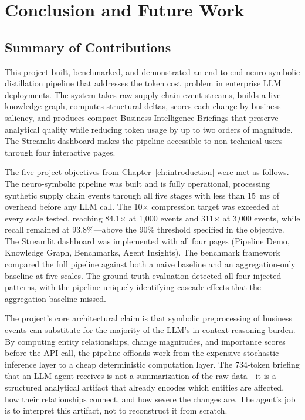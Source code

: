 \chapter{Conclusion and Future Work}
\label{ch:conclusion}

\section{Summary of Contributions}
\label{sec:contributions}

This project built, benchmarked, and demonstrated an end-to-end neuro-symbolic distillation
pipeline that addresses the token cost problem in enterprise LLM deployments. The system
takes raw supply chain event streams, builds a live knowledge graph, computes structural
deltas, scores each change by business saliency, and produces compact Business Intelligence
Briefings that preserve analytical quality while reducing token usage by up to two orders
of magnitude. The Streamlit dashboard makes the pipeline accessible to non-technical users
through four interactive pages.

The five project objectives from Chapter~\ref{ch:introduction} were met as follows.
The neuro-symbolic pipeline was built and is fully operational, processing synthetic supply
chain events through all five stages with less than 15~ms of overhead before any LLM call.
The 10$\times$ compression target was exceeded at every scale tested, reaching 84.1$\times$
at 1,000 events and 311$\times$ at 3,000 events, while recall remained at 93.8\%---above
the 90\% threshold specified in the objective. The Streamlit dashboard was implemented with
all four pages (Pipeline Demo, Knowledge Graph, Benchmarks, Agent Insights). The benchmark
framework compared the full pipeline against both a naive baseline and an aggregation-only
baseline at five scales. The ground truth evaluation detected all four injected patterns,
with the pipeline uniquely identifying cascade effects that the aggregation baseline missed.

The project's core architectural claim is that symbolic preprocessing of business events
can substitute for the majority of the LLM's in-context reasoning burden. By computing
entity relationships, change magnitudes, and importance scores before the API call, the
pipeline offloads work from the expensive stochastic inference layer to a cheap deterministic
computation layer. The 734-token briefing that an LLM agent receives is not a summarization
of the raw data---it is a structured analytical artifact that already encodes which entities
are affected, how their relationships connect, and how severe the changes are. The agent's
job is to interpret this artifact, not to reconstruct it from scratch.


